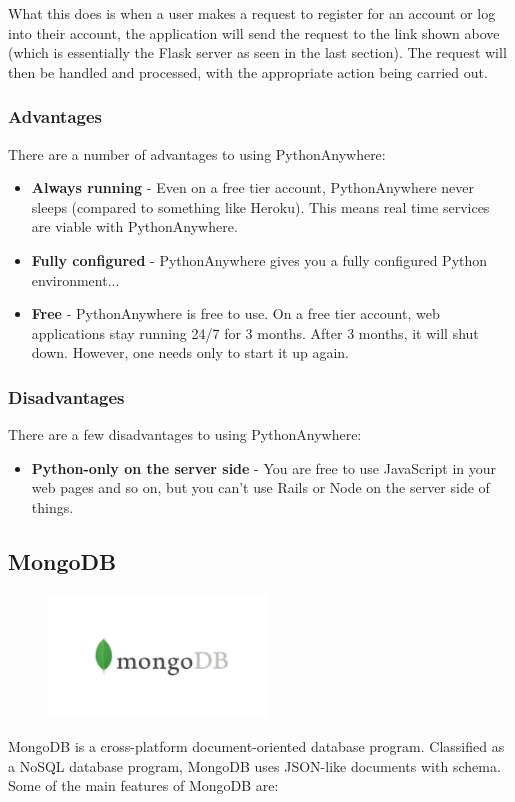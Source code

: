 What this does is when a user makes a request to register for an account or log into their account, the application will send the request to the link shown above (which is essentially the Flask server as seen in the last section). The request will then be handled and processed, with the appropriate action being carried out.

\newpage
\subsubsection{Advantages}
There are a number of advantages to using PythonAnywhere:

\begin{itemize}
    \item \textbf{Always running} - Even on a free tier account, PythonAnywhere
    never sleeps (compared to something like Heroku). This means real time 
    services are viable with PythonAnywhere.
    \item \textbf{Fully configured} - PythonAnywhere gives you a fully
    configured Python environment...
    \item \textbf{Free} - PythonAnywhere is free to use. On a free tier account,
    web applications stay running 24/7 for 3 months. After 3 months, it will
    shut down. However, one needs only to start it up again.
\end{itemize}

\subsubsection{Disadvantages}
There are a few disadvantages to using PythonAnywhere:

\begin{itemize}
    \item \textbf{Python-only on the server side} - You are free to use
    JavaScript in your web pages and so on, but you can't use Rails or Node on 
    the server side of things.
\end{itemize}

\subsection{MongoDB}
\par
\medskip
\begin{center}
    \includegraphics[width=8cm,height=3.3cm,keepaspectratio]{images/mongodb}
\end{center}
MongoDB is a cross-platform document-oriented database program. Classified as a
NoSQL database program, MongoDB uses JSON-like documents with schema. Some of 
the main features of MongoDB are:

